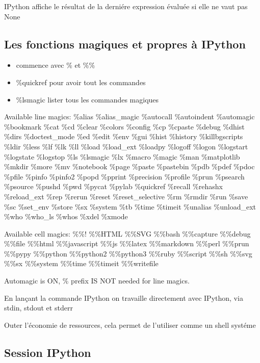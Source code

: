 \documentclass[11pt]{article}
\providecommand{\tightlist}{%
      \setlength{\itemsep}{0pt}\setlength{\parskip}{0pt}}
\begin{document}
IPython affiche le résultat de la derniére expression évaluée si elle ne
vaut pas None

    \subsection{Les fonctions magiques et propres à
IPython}\label{les-fonctions-magiques-et-propres-uxe0-ipython}

\begin{itemize}
\tightlist
\item
  commence avec \% et \%\%
\item
  \%quickref pour avoir tout les commandes
\item
  \%lsmagic lister tous les commandes magiques
\end{itemize}

Available line magics: \%alias \%alias\_magic \%autocall \%autoindent
\%automagic \%bookmark \%cat \%cd \%clear \%colors \%config \%cp
\%cpaste \%debug \%dhist \%dirs \%doctest\_mode \%ed \%edit \%env \%gui
\%hist \%history \%killbgscripts \%ldir \%less \%lf \%lk \%ll \%load
\%load\_ext \%loadpy \%logoff \%logon \%logstart \%logstate \%logstop
\%ls \%lsmagic \%lx \%macro \%magic \%man \%matplotlib \%mkdir \%more
\%mv \%notebook \%page \%paste \%pastebin \%pdb \%pdef \%pdoc \%pfile
\%pinfo \%pinfo2 \%popd \%pprint \%precision \%profile \%prun \%psearch
\%psource \%pushd \%pwd \%pycat \%pylab \%quickref \%recall \%rehashx
\%reload\_ext \%rep \%rerun \%reset \%reset\_selective \%rm \%rmdir
\%run \%save \%sc \%set\_env \%store \%sx \%system \%tb \%time \%timeit
\%unalias \%unload\_ext \%who \%who\_ls \%whos \%xdel \%xmode

Available cell magics: \%\%! \%\%HTML \%\%SVG \%\%bash \%\%capture
\%\%debug \%\%file \%\%html \%\%javascript \%\%js \%\%latex \%\%markdown
\%\%perl \%\%prun \%\%pypy \%\%python \%\%python2 \%\%python3 \%\%ruby
\%\%script \%\%sh \%\%svg \%\%sx \%\%system \%\%time \%\%timeit
\%\%writefile

Automagic is ON, \% prefix IS NOT needed for line magics.

    En lançant la commande IPython on travaille directement avec IPython,
via stdin, stdout et stderr

Outer l'économie de ressources, cela permet de l'utiliser comme un shell
systéme

    \subsection{Session IPython}\label{session-ipython}
\end{document}
